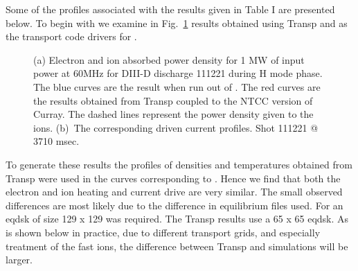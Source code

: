 Some of the profiles associated with the results given in Table I are
 presented below. 
 To begin with we examine in Fig.~\ref{Figbwav2a} results obtained
 using Transp and \ot as the transport code drivers for \ct.  
 \begin{figure} %
\begin{narrow}{-.50in}{0in} 
 \mbox{}
\end{narrow}
 \caption{ (a) Electron and ion absorbed power density for 1 MW of input
  power at 60MHz for DIII-D discharge 111221 during  H mode phase. The blue curves are the \ct result when run out of  \ot. The red
  curves are the results obtained from Transp coupled to the NTCC
  version of Curray. The dashed lines represent the power density
  given to the ions.
(b)~The corresponding driven current profiles.
Shot 111221 @ 3710 msec.} 
  \label{Figbwav2a}
 \end{figure}
To generate these results the profiles of densities and temperatures
obtained from Transp were used in the curves corresponding to \ot.  
Hence we find that both the electron and ion
heating  and current drive are very similar. The small observed
differences  are most likely due to the difference
in equilibrium files used. For \ot an eqdsk of size 129 x 129 was
required. The Transp results use a 65 x 65 eqdsk.
 As is shown below
in practice, due to
different transport grids, and especially treatment of the fast ions,
the difference between Transp and \ot simulations will be larger. 

